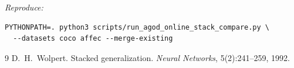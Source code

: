 \documentclass[11pt]{article}
\begin{document}
\vspace{0.5em}
\noindent\textit{Reproduce:}
\begin{verbatim}
PYTHONPATH=. python3 scripts/run_agod_online_stack_compare.py \
  --datasets coco affec --merge-existing
\end{verbatim}

\begin{thebibliography}{9}
D.~H.~Wolpert.
\newblock Stacked generalization.
\newblock \emph{Neural Networks}, 5(2):241--259, 1992.
\end{thebibliography}
\end{document}
